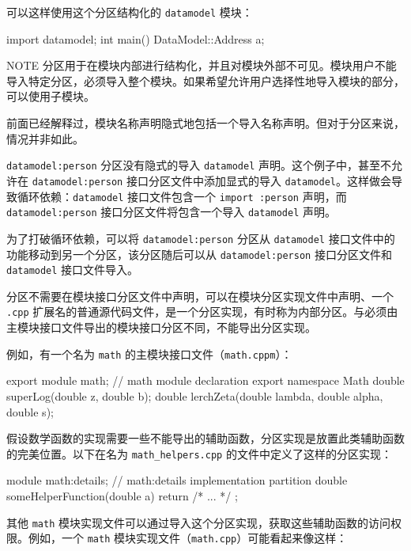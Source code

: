 可以这样使用这个分区结构化的 \verb|datamodel| 模块：

\begin{cpp}
import datamodel;
int main() { DataModel::Address a; }
\end{cpp}

\begin{myNotic}{NOTE}
分区用于在模块内部进行结构化，并且对模块外部不可见。模块用户不能导入特定分区，必须导入整个模块。如果希望允许用户选择性地导入模块的部分，可以使用子模块。
\end{myNotic}

前面已经解释过，模块名称声明隐式地包括一个导入名称声明。但对于分区来说，情况并非如此。

\verb|datamodel:person| 分区没有隐式的导入 \verb|datamodel| 声明。这个例子中，甚至不允许在 \verb|datamodel:person| 接口分区文件中添加显式的导入 \verb|datamodel|。这样做会导致循环依赖：\verb|datamodel| 接口文件包含一个 \verb|import :person| 声明，而 \verb|datamodel:person| 接口分区文件将包含一个导入 \verb|datamodel| 声明。

为了打破循环依赖，可以将 \verb|datamodel:person| 分区从 \verb|datamodel| 接口文件中的功能移动到另一个分区，该分区随后可以从 \verb|datamodel:person| 接口分区文件和 \verb|datamodel| 接口文件导入。


分区不需要在模块接口分区文件中声明，可以在模块分区实现文件中声明、一个 \verb|.cpp| 扩展名的普通源代码文件，是一个分区实现，有时称为内部分区。与必须由主模块接口文件导出的模块接口分区不同，不能导出分区实现。

例如，有一个名为 \verb|math| 的主模块接口文件（\verb|math.cppm|）：

\begin{cpp}
export module math; // math module declaration
export namespace Math
{
    double superLog(double z, double b);
    double lerchZeta(double lambda, double alpha, double s);
}
\end{cpp}

假设数学函数的实现需要一些不能导出的辅助函数，分区实现是放置此类辅助函数的完美位置。以下在名为 \verb|math_helpers.cpp| 的文件中定义了这样的分区实现：

\begin{cpp}
module math:details; // math:details implementation partition
double someHelperFunction(double a) { return /* ... */ ; }
\end{cpp}

其他 \verb|math| 模块实现文件可以通过导入这个分区实现，获取这些辅助函数的访问权限。例如，一个 \verb|math| 模块实现文件（\verb|math.cpp|）可能看起来像这样：

